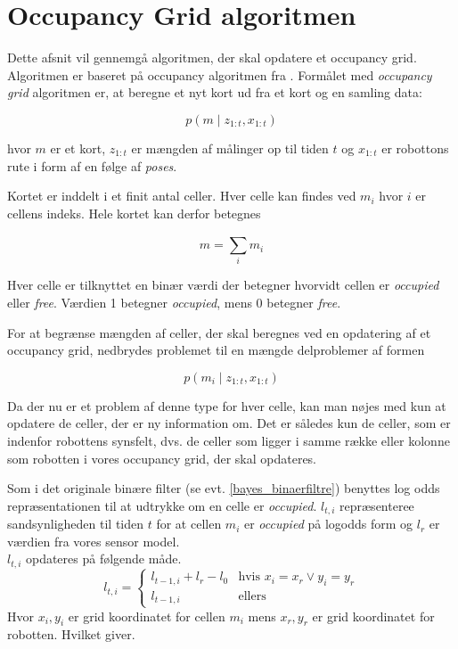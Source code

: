 \section{Occupancy Grid algoritmen}
Dette afsnit vil gennemgå algoritmen, der skal opdatere et occupancy grid.
Algoritmen er baseret på occupancy algoritmen fra \cite[p. 286]{probabilisticRobotics}.
Formålet med \textit{occupancy grid} algoritmen er, at beregne	et nyt kort ud fra et kort og en samling data:

\begin{equation}
p(m \mid z_{1:t}, x_{1:t})
\end{equation}

hvor $m$ er et kort, $ z_{1:t} $ er mængden af målinger op til tiden $t$ og $ x_{1:t} $ er robottons rute i form af en følge af \textit{poses}.

Kortet er inddelt i et finit antal celler.
Hver celle kan findes ved $ m_i $ hvor $i$ er cellens indeks. 
Hele kortet kan derfor betegnes

\begin{equation}
m = \sum_{i}^{} m_i 
\end{equation}

Hver celle er tilknyttet en binær værdi der betegner hvorvidt cellen er \textit{occupied} eller \textit{free}.
Værdien 1 betegner \textit{occupied}, mens 0 betegner \textit{free}.

For at begrænse mængden af celler, der skal beregnes ved en opdatering af et occupancy grid, nedbrydes problemet til en mængde delproblemer af formen

\begin{equation}
p(m_i \mid z_{1:t}, x_{1:t})
\end{equation} 

Da der nu er et problem af denne type for hver celle, kan man nøjes med kun at opdatere de celler, der er ny information om. 
Det er således kun de celler, som er indenfor robottens synsfelt, dvs. de celler som ligger i samme række eller kolonne som robotten i vores occupancy grid, der skal opdateres.


Som i det originale binære filter (se evt. \cref{bayes_binaerfiltre}) benyttes log odds repræsentationen til at udtrykke om en celle er \textit{occupied}.
$l_{t,i}$ repræsenteree sandsynligheden til tiden $t$ for at cellen $m_i$ er \textit{occupied} på logodds form og $l_r$ er værdien fra vores sensor model. \\

$l_{t,i}$ opdateres på følgende måde.
\begin{equation}
	l_{t,i} = \begin{cases}
		l_{t-1,i} + l_r - l_0 &\text{hvis } x_i = x_r \vee y_i = y_r \\
		l_{t-1,i} &\text{ellers}
	\end{cases}
\end{equation}
Hvor $x_i, y_i$ er grid koordinatet for cellen $m_i$ mens $x_r, y_r$ er grid koordinatet for robotten. Hvilket giver.

